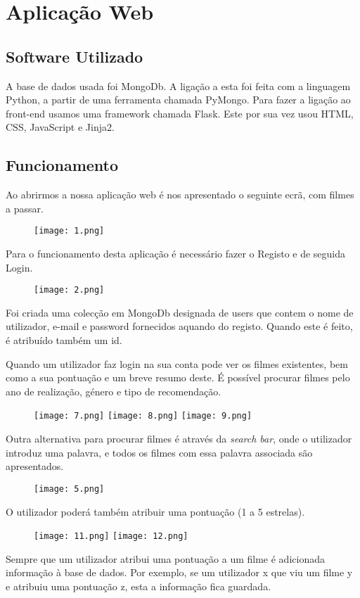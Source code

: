 \section{Aplicação Web}

\subsection{Software Utilizado}

A base de dados usada foi MongoDb.
A ligação a esta foi feita com a linguagem Python, a partir de uma ferramenta chamada PyMongo.
Para fazer a ligação ao front-end usamos uma framework chamada Flask.
Este por sua vez usou HTML, CSS, JavaScript e Jinja2.

\subsection{Funcionamento}

Ao abrirmos a nossa aplicação web é nos apresentado o seguinte ecrã, com filmes a passar.

\begin{figure}[H]
\centering
\texttt{[image: 1.png]}
\end{figure}


Para o funcionamento desta aplicação é necessário fazer o Registo e de seguida Login.
\begin{figure}[H]
\centering
\texttt{[image: 2.png]}
\end{figure}


Foi criada uma colecção em MongoDb designada de users que contem o nome de utilizador, e-mail e password fornecidos aquando do registo. Quando este é feito, é atribuído também um id.

Quando um utilizador faz login na sua conta pode ver os filmes existentes, bem como a sua pontuação e um breve resumo deste. É possível procurar filmes pelo ano de realização, género e tipo de recomendação. 

 \begin{figure}[H]
\centering
\texttt{[image: 7.png]}
\texttt{[image: 8.png]}
\texttt{[image: 9.png]}
\end{figure}

Outra alternativa para procurar filmes é através da \textit{search bar}, onde o utilizador introduz uma palavra, e todos os filmes com essa palavra associada são apresentados.


\begin{figure}[H]
\centering
\texttt{[image: 5.png]}
\end{figure}

O utilizador poderá também atribuir uma pontuação (1 a 5 estrelas).

\begin{figure}[H]
\centering
\texttt{[image: 11.png]}
\texttt{[image: 12.png]}
\end{figure}


Sempre que um utilizador atribui uma pontuação a um filme é adicionada informação à base de dados. Por exemplo, se um utilizador x que viu um filme y e atribuiu uma pontuação z, esta a informação fica guardada.

\newpage
